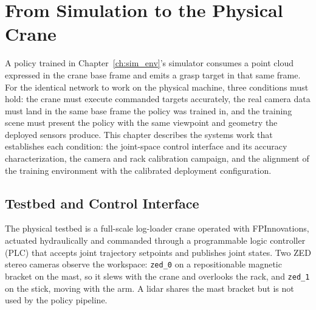 
\chapter{From Simulation to the Physical Crane}
\label{ch:sim2real}

A policy trained in Chapter~\ref{ch:sim_env}'s simulator consumes a point
cloud expressed in the crane base frame and emits a grasp target in that same
frame. For the identical network to work on the physical machine, three
conditions must hold: the crane must execute commanded targets accurately,
the real camera data must land in the same base frame the policy was trained
in, and the training scene must present the policy with the same viewpoint
and geometry the deployed sensors produce. This chapter describes the
systems work that establishes each condition: the joint-space control
interface and its accuracy characterization, the camera and rack calibration
campaign, and the alignment of the training environment with the calibrated
deployment configuration.

\section{Testbed and Control Interface}
\label{sec:s2r_control}

The physical testbed is a full-scale log-loader crane operated with
FPInnovations, actuated hydraulically and commanded through a programmable
logic controller (PLC) that accepts joint trajectory setpoints and publishes
joint states. Two ZED stereo cameras observe the workspace: \texttt{zed\_0}
on a repositionable magnetic bracket on the mast, so it slews with the crane
and overlooks the rack, and \texttt{zed\_1} on the stick, moving with the
arm. A lidar shares the mast bracket but is not used by the policy pipeline.

